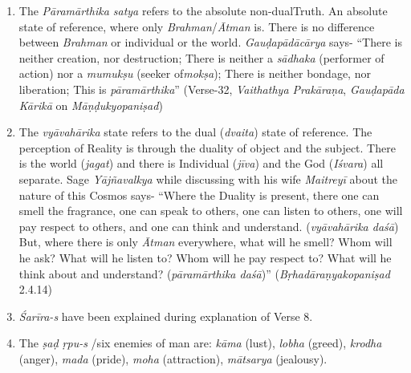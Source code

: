 \begin{enumerate}
\itemsep=0pt
\item
  The \emph{Pāramārthika satya} refers to the absolute non-dual\break Truth. An absolute state of reference, where only \emph{Brahman}/\emph{Ātman} is. There is no difference between \emph{Brahman} or individual or the world. \emph{Gauḍapādācārya} says- ``There is neither creation, nor destruction; There is neither a \emph{sādhaka} (performer of action) nor a \emph{mumukṣu} (seeker of\break \emph{mokṣa}); There is neither bondage, nor liberation; This is \emph{pāramārthika}'' (Verse-32, \emph{Vaithathya Prakāraṇa}, \emph{Gauḍapāda Kārikā} on \emph{Māṇḍukyopaniṣad})
\item
  The \emph{vyāvahārika} state refers to the dual (\emph{dvaita}) state of reference. The perception of Reality is through the duality of object and the subject. There is the world (\emph{jagat}) and there is Individual (\emph{jīva}) and the God (\emph{Iśvara}) all separate. Sage \emph{Yājñavalkya} while discussing with his wife \emph{Maitreyī} about the nature of this Cosmos says- ``Where the Duality is present, there one can smell the fragrance, one can speak to others, one can listen to others, one will pay respect to others, and one can think and understand. (\emph{vyāvahārika daśā}) But, where there is only \emph{Ātman} everywhere, what will he smell? Whom will he ask? What will he listen to? Whom will he pay respect to? What will he think about and understand? (\emph{pāramārthika daśā})'' (\emph{Bṛhadāraṇyakopaniṣad} 2.4.14)
\item
  \emph{Śarīra-s} have been explained during explanation of Verse 8.
\item
  The \emph{ṣaḍ ṛpu-s} /six enemies of man are: \emph{kāma} (lust), \emph{lobha} (greed), \emph{krodha} (anger), \emph{mada} (pride), \emph{moha} (attraction), \emph{mātsarya} (jealousy).
\end{enumerate}

